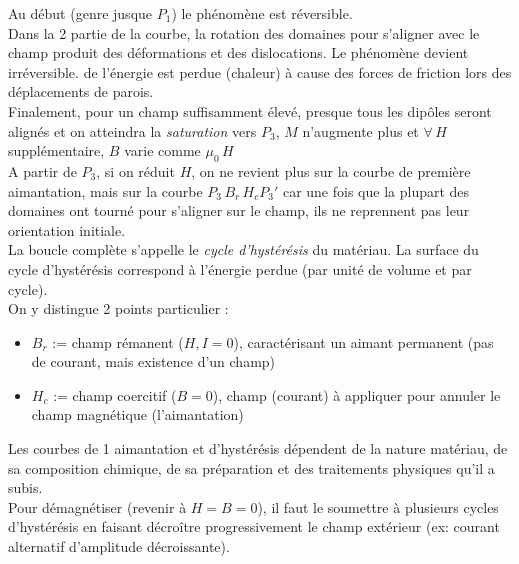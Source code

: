 \documentclass[11pt, a4paper, openany]{book}
\begin{document}
		Au début (genre jusque $P_1$) le phénomène est réversible.\\
		Dans la 2 partie de la courbe, la rotation des domaines pour s'aligner avec le champ produit des déformations et des dislocations. Le phénomène  devient irréversible. de l'énergie est perdue (chaleur) à cause des forces de friction lors des déplacements de parois.\\
		
		Finalement, pour un champ suffisamment élevé, presque tous les dipôles seront alignés et on atteindra la \textit{saturation} vers $P_3$, $M$ n'augmente plus et $\forall\, H$ supplémentaire, $B$ varie comme $\mu_0\,H$\\
		
		A partir de $P_3$, si on réduit $H$, on ne revient plus sur la courbe de première aimantation, mais sur la courbe $P_3\,B_r\,H_c P_3'$ car une fois que la plupart des domaines ont tourné pour s'aligner sur le champ, ils ne reprennent pas leur orientation initiale.\\
		
		La boucle complète s'appelle le \textit{cycle d'hystérésis} du matériau. La surface du cycle d'hystérésis correspond à l'énergie perdue (par unité de volume et par cycle).\\
		On y distingue 2 points particulier :\begin{itemize}
			\item $B_r$ := champ rémanent ($H,I=0$), caractérisant un aimant permanent (pas de courant, mais existence d'un champ)
			\item $H_c$ := champ coercitif ($B=0$), champ (courant) à appliquer pour annuler le champ magnétique (l'aimantation)
		\end{itemize}
		Les courbes de 1 aimantation et d'hystérésis dépendent de la nature matériau, de sa composition chimique, de sa préparation et des traitements physiques qu'il a subis.\\
		
		Pour démagnétiser (revenir à $H=B=0$), il faut le soumettre à plusieurs cycles d'hystérésis en faisant décroître progressivement le champ extérieur (ex: courant alternatif d'amplitude décroissante).
		
\end{document}
